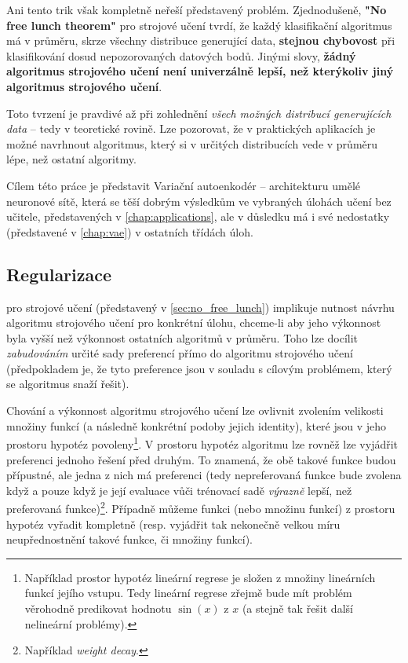 Ani tento trik však kompletně neřeší představený problém. Zjednodušeně, \textbf{"No free lunch theorem"} pro strojové učení tvrdí, že každý klasifikační algoritmus má v průměru, skrze všechny distribuce generující data, \textbf{stejnou chybovost} při klasifikování dosud nepozorovaných datových bodů. \cite{Wolpert1996}
Jinými slovy, \textbf{žádný algoritmus strojového učení není univerzálně lepší, než kterýkoliv jiný algoritmus strojového učení}.

Toto tvrzení je pravdivé až při zohlednění \emph{všech možných distribucí generujících data} – tedy v teoretické rovině.
Lze pozorovat, že v praktických aplikacích je možné navrhnout algoritmus, který si v určitých distribucích vede v průměru lépe, než ostatní algoritmy. \cite{Goodfellow2016}

Cílem této práce je představit Variační autoenkodér – architekturu umělé neuronové sítě, která se těší dobrým výsledkům ve vybraných úlohách učení bez učitele, představených v \autoref{chap:applications}, ale v důsledku má i své nedostatky (představené v \autoref{chap:vae}) v ostatních třídách úloh.

\subsection{Regularizace}
 pro strojové učení (představený v \autoref{sec:no_free_lunch}) implikuje nutnost návrhu algoritmu strojového učení pro konkrétní úlohu, chceme-li aby jeho výkonnost byla vyšší než výkonnost ostatních algoritmů v průměru.
Toho lze docílit \emph{zabudováním} určité sady preferencí přímo do algoritmu strojového učení (předpokladem je, že tyto preference jsou v souladu s cílovým problémem, který se algoritmus snaží řešit). \cite{Goodfellow2016}

Chování a výkonnost algoritmu strojového učení lze ovlivnit zvolením velikosti množiny funkcí (a následně konkrétní podoby jejich identity), které jsou v jeho prostoru hypotéz povoleny\footnote{Například prostor hypotéz lineární regrese je složen z množiny lineárních funkcí jejího vstupu. Tedy lineární regrese zřejmě bude mít problém věrohodně predikovat hodnotu $\sin(x)$ z $x$ (a stejně tak řešit další nelineární problémy).}.
V prostoru hypotéz algoritmu lze rovněž lze vyjádřit preferenci jednoho řešení před druhým.
To znamená, že obě takové funkce budou přípustné, ale jedna z nich má preferenci (tedy nepreferovaná funkce bude zvolena když a pouze když je její evaluace vůči trénovací sadě \emph{výrazně} lepší, než preferovaná funkce)\footnote{Například \emph{weight decay}.}.
Případně můžeme funkci (nebo množinu funkcí) z prostoru hypotéz vyřadit kompletně (resp. vyjádřit tak nekonečně velkou míru neupřednostnění takové funkce, či množiny funkcí). \cite{Goodfellow2016}

